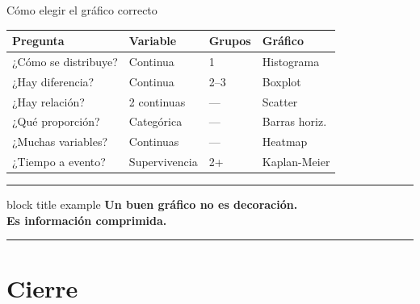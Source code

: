 \documentclass[aspectratio=169,10pt]{beamer}
\begin{document}
\begin{frame}{Cómo elegir el gráfico correcto}
  \begin{center}
    \renewcommand{\arraystretch}{1.5}
    \begin{tabular}{p{3.0cm} p{3.0cm} p{2.8cm} p{3.5cm}}
      \toprule
      \textbf{Pregunta} & \textbf{Variable} & \textbf{Grupos} & \textbf{Gráfico} \\
      \midrule
      ¿Cómo se distribuye? & Continua      & 1    & Histograma \\
      ¿Hay diferencia?     & Continua      & 2--3 & Boxplot \\
      ¿Hay relación?       & 2 continuas   & ---  & Scatter \\
      ¿Qué proporción?     & Categórica    & ---  & Barras horiz. \\
      ¿Muchas variables?   & Continuas     & ---  & Heatmap \\
      ¿Tiempo a evento?    & Supervivencia & 2+   & Kaplan-Meier \\
      \bottomrule
    \end{tabular}
  \end{center}
\end{frame}

\begin{frame}
  \begin{center}
    \vspace{4mm}
    {\color{UCblue!30}\rule{\textwidth}{1.5pt}}
    \vspace{6mm}
    \begin{beamercolorbox}[sep=18pt,center,rounded=true,shadow=true]{block title example}
      \LARGE\bfseries Un buen gráfico no es decoración.\\[4mm]
      \Large Es información comprimida.
    \end{beamercolorbox}
    \vspace{6mm}
    {\color{UCblue!30}\rule{\textwidth}{1.5pt}}
  \end{center}
\end{frame}


\section{Cierre}
\end{document}
